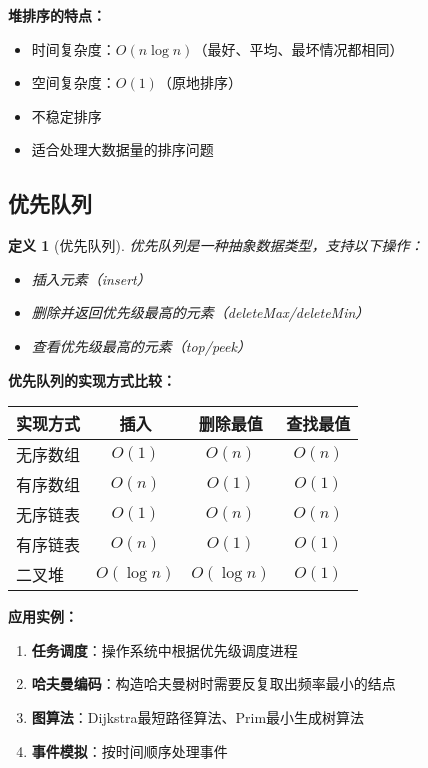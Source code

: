 \documentclass[12pt,a4paper]{amsart}
\newtheorem{definition}{定义}[section]
\begin{document}
\textbf{堆排序的特点：}
\begin{itemize}
\item 时间复杂度：$O(n \log n)$（最好、平均、最坏情况都相同）
\item 空间复杂度：$O(1)$（原地排序）
\item 不稳定排序
\item 适合处理大数据量的排序问题
\end{itemize}

\subsection{优先队列}

\begin{definition}[优先队列]
优先队列是一种抽象数据类型，支持以下操作：
\begin{itemize}
\item 插入元素（insert）
\item 删除并返回优先级最高的元素（deleteMax/deleteMin）
\item 查看优先级最高的元素（top/peek）
\end{itemize}
\end{definition}

\textbf{优先队列的实现方式比较：}
\begin{center}
\begin{tabular}{|l|c|c|c|}
\hline
\textbf{实现方式} & \textbf{插入} & \textbf{删除最值} & \textbf{查找最值} \\
\hline
无序数组 & $O(1)$ & $O(n)$ & $O(n)$ \\
\hline
有序数组 & $O(n)$ & $O(1)$ & $O(1)$ \\
\hline
无序链表 & $O(1)$ & $O(n)$ & $O(n)$ \\
\hline
有序链表 & $O(n)$ & $O(1)$ & $O(1)$ \\
\hline
二叉堆 & $O(\log n)$ & $O(\log n)$ & $O(1)$ \\
\hline
\end{tabular}
\end{center}

\textbf{应用实例：}
\begin{enumerate}
\item \textbf{任务调度}：操作系统中根据优先级调度进程
\item \textbf{哈夫曼编码}：构造哈夫曼树时需要反复取出频率最小的结点
\item \textbf{图算法}：Dijkstra最短路径算法、Prim最小生成树算法
\item \textbf{事件模拟}：按时间顺序处理事件
\end{enumerate}
\end{document}
